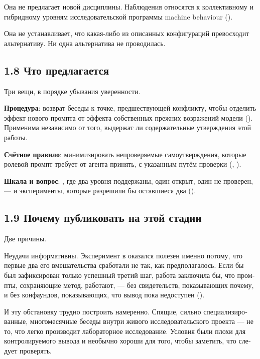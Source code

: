\begin{russian}
Она не предлагает новой дисциплины. Наблюдения относятся к коллективному и гибридному уровням исследовательской программы machine behaviour ().

Она не устанавливает, что какая-либо из описанных конфигураций превосходит альтернативу. Ни одна альтернатива не проводилась.


\subsection*{1.8 Что предлагается}
\label{sec:ru:1.8}

Три вещи, в порядке убывания уверенности.

\textbf{Процедура}: возврат беседы к точке, предшествующей конфликту, чтобы отделить эффект нового промпта от эффекта собственных прежних возражений модели (). Применима независимо от того, выдержат ли содержательные утверждения этой работы.

\textbf{Счётное правило}: минимизировать непроверяемые самоутверждения, которые ролевой промпт требует от агента принять, с указанным путём проверки (, ).

\textbf{Шкала и вопрос}: , где два уровня поддержаны, один открыт, один не проверен, — и эксперименты, которые разрешили бы оставшиеся два ().


\subsection*{1.9 Почему публиковать на этой стадии}
\label{sec:ru:1.9}

Две причины.

Неудачи информативны. Эксперимент в  оказался полезен именно потому, что первые два его вмешательства сработали не так, как предполагалось. Если бы был зафиксирован только успешный третий шаг, работа заключила бы, что промпты, сохраняющие метод, работают, — без свидетельств, показывающих почему, и без конфаундов, показывающих, что вывод пока недоступен ().

И эту обстановку трудно построить намеренно. Спящие, сильно специализированные, многомесячные беседы внутри живого исследовательского проекта — не то, что легко производит лабораторное исследование. Условия были плохи для контролируемого вывода и необычно хороши для того, чтобы заметить, что следует проверять.



\end{russian}
